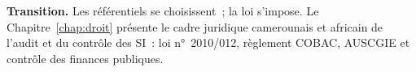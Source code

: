 \bigskip

\begin{boxinfo}
\textbf{Transition.} Les référentiels se choisissent~; la loi s'impose. Le
Chapitre~\ref{chap:droit} présente le cadre juridique camerounais et
africain de l'audit et du contrôle des SI~: loi n°~2010/012, règlement
COBAC, AUSCGIE et contrôle des finances publiques.
\end{boxinfo}
